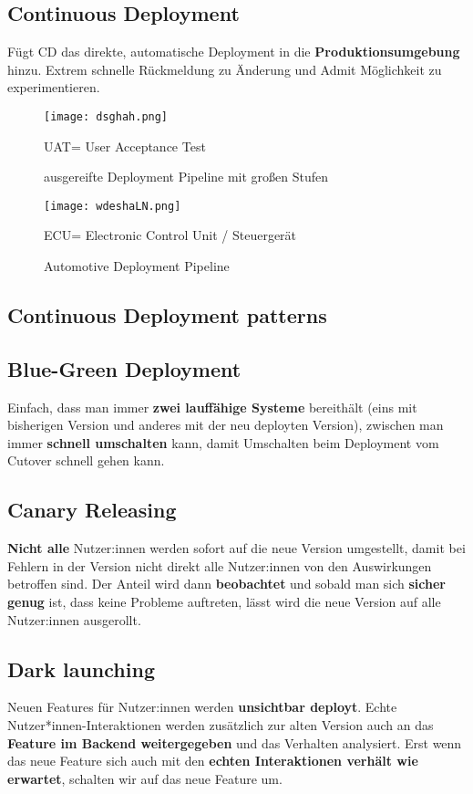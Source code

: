 \documentclass{book}
\begin{document}
    \subsection{Continuous Deployment}
    Fügt CD das direkte, automatische Deployment in die \textbf{Produktionsumgebung} hinzu. \newline
    Extrem schnelle Rückmeldung zu Änderung und Admit Möglichkeit zu experimentieren.
    \begin{figure}[H]
        \centering
        \texttt{[image: dsghah.png]}
        \caption{ausgereifte Deployment Pipeline mit großen Stufen}
        \label{fig:enter-label}
        UAT= User Acceptance Test
    \end{figure}
    \clearpage
    \begin{figure}[H]
        \centering
        \texttt{[image: wdeshaLN.png]}
        \caption{Automotive Deployment Pipeline}
        \label{fig:enter-label}
        ECU= Electronic Control Unit / Steuergerät
    \end{figure}
    \subsection{Continuous Deployment patterns}
    \subsection{Blue-Green Deployment}
    Einfach, dass man immer \textbf{zwei lauffähige Systeme} bereithält (eins mit bisherigen Version und anderes mit der neu deployten Version), zwischen man immer \textbf{schnell umschalten} kann, damit Umschalten beim Deployment vom Cutover schnell gehen kann.
    \subsection{Canary Releasing}
    \textbf{Nicht alle} Nutzer:innen werden sofort auf die neue Version umgestellt, damit bei Fehlern in der Version nicht direkt alle Nutzer:innen von den Auswirkungen betroffen sind. \newline
    Der Anteil wird dann \textbf{beobachtet} und sobald man sich \textbf{sicher genug} ist, dass keine Probleme auftreten, lässt wird die neue Version auf alle Nutzer:innen ausgerollt.
    \subsection{Dark launching}
    Neuen Features für Nutzer:innen werden \textbf{unsichtbar deployt}. Echte Nutzer*innen-Interaktionen werden
    zusätzlich zur alten Version auch an das \textbf{Feature im Backend weitergegeben}
    und das Verhalten analysiert. \newline Erst wenn das neue Feature sich auch mit den
    \textbf{echten Interaktionen verhält wie erwartet}, schalten wir auf das neue Feature
    um.
\end{document}

